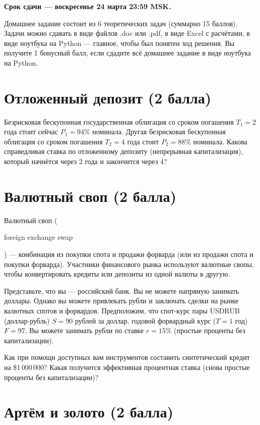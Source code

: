 \documentclass[a4paper,14pt]{extarticle}
\newcommand{\en}[1]{\begin{otherlanguage}{english}#1\end{otherlanguage}}
\begin{document}
\noindent \textbf{Срок сдачи --- воскресенье 24 марта 23:59 MSK.}

\vspace{\baselineskip}

\noindent Домашнее задание состоит из 6 теоретических задач (суммарно 15 баллов). Задачи 
можно сдавать в виде файлов .doc или .pdf, в виде Excel с расчётами, в виде ноутбука на Python --- главное, чтобы был понятен ход решения. Вы получите 1 бонусный балл, если сдадите всё домашнее задание в виде ноутбука на Python.


\section{Отложенный депозит (2 балла)}

Безрисковая бескупонная государственная облигация со сроком погашения $T_1=2$ года стоит
сейчас $P_1=94\%$ номинала. Другая безрисковая бескупонная облигация со сроком погашения $T_2=4$ года стоит $P_2 = 88\%$ номинала. Какова справедливая ставка по отложенному депозиту (непрерывная капитализация), который начнётся через 2 года и закончится через 4?

\section{Валютный своп (2 балла)}

Валютный своп (\en{foreign exchange swap}) --- комбинация из покупки спота и продажи форварда (или из продажи спота и покупки форварда). Участники финансового рынка используют валютные свопы, чтобы конвертировать кредиты или депозиты из одной валюты в другую.

Представьте, что вы --- российский банк. Вы не можете напрямую занимать доллары. Однако вы можете привлекать рубли и заключать сделки на рынке валютных спотов и форвардов. Предположим, что спот-курс пары USDRUB (доллар-рубль) $S=90$ рублей за доллар, годовой форвардный курс ($T=1$ год) $F=97$. Вы можете занимать рубли по ставке $r=15\%$ (простые проценты без капитализации).

Как при помощи доступных вам инструментов составить синтетический кредит на \$1\,000\,000? Какая получится эффективная процентная ставка (снова простые проценты без капитализации)?

\section{Артём и золото (2 балла)}
\end{document}
